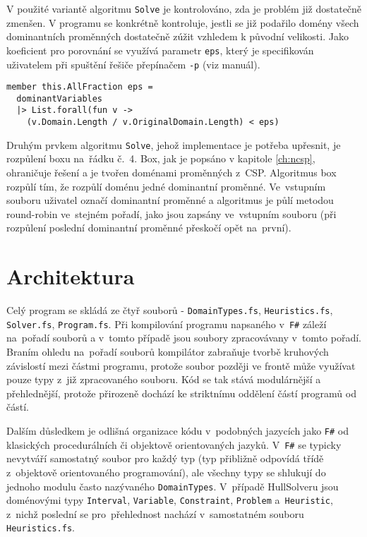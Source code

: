 V použité variantě algoritmu \verb|Solve| je kontrolováno, zda je problém již dostatečně zmenšen. V programu se konkrétně kontroluje, jestli se již podařilo domény všech dominantních proměnných dostatečně zúžit vzhledem k původní velikosti. Jako koeficient pro porovnání se využívá parametr \verb|eps|, který je specifikován uživatelem při spuštění řešiče přepínačem \verb|-p| (viz manuál).

\begin{Verbatim}[samepage=true]
member this.AllFraction eps =
  dominantVariables 
  |> List.forall(fun v -> 
    (v.Domain.Length / v.OriginalDomain.Length) < eps)
\end{Verbatim}


Druhým prvkem algoritmu \verb|Solve|, jehož implementace je potřeba upřesnit, je rozpůlení boxu na~řádku č.~4. Box, jak je popsáno v kapitole \ref{ch:ncsp}, ohraničuje řešení a je tvořen doménami proměnných z~CSP. Algoritmus box rozpůlí tím, že rozpůlí doménu jedné dominantní proměnné. Ve~vstupním souboru uživatel označí dominantní proměnné a algoritmus je půlí metodou round-robin ve~stejném pořadí, jako jsou zapsány ve~vstupním souboru (při rozpůlení poslední dominantní proměnné přeskočí opět na~první).


\section{Architektura}
Celý program se skládá ze čtyř souborů - \verb|DomainTypes.fs|, \verb|Heuristics.fs|, \verb|Solver.fs|, \verb|Program.fs|. Při kompilování programu napsaného v~\texttt{F\#} záleží na~pořadí souborů a v~tomto případě jsou soubory zpracovávany v~tomto pořadí. Braním ohledu na~pořadí souborů kompilátor zabraňuje tvorbě kruhových závislostí mezi částmi programu, protože soubor později ve frontě může využívat pouze typy z~již zpracovaného souboru. Kód se tak stává modulárnější a přehlednější, protože přirozeně dochází ke striktnímu oddělení  částí programů od  částí.

Dalším důsledkem je odlišná organizace kódu v~podobných jazycích jako \texttt{F\#} od klasických procedurálních či objektově orientovaných jazyků. V~\texttt{F\#} se typicky nevytváří samostatný soubor pro každý typ (typ přibližně odpovídá třídě z~objektově orientovaného programování), ale všechny typy se shlukují do jednoho modulu často nazývaného \verb|DomainTypes|. V~případě HullSolveru jsou doménovými typy \verb|Interval|, \verb|Variable|, \verb|Constraint|, \verb|Problem| a~\verb|Heuristic|, z~nichž poslední se pro~přehlednost nachází v~samostatném souboru \verb|Heuristics.fs|.

